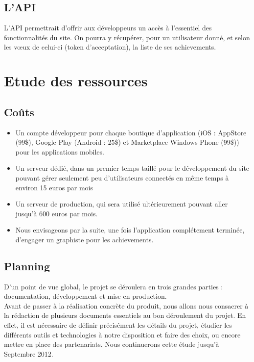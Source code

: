 \documentclass{life-fr}
\begin{document}
\section{L'API}

L'API permettrait d'offrir aux développeurs un accès à l'essentiel des fonctionnalités du site. On pourra y récupérer, pour un utilisateur donné, et selon les vœux de celui-ci (token d'acceptation), la liste de ses achievements.

\chapter{Etude des ressources}

\section{Coûts}

\begin{itemize}
  \item Un compte développeur pour chaque boutique d'application (iOS : AppStore (99\$), Google Play (Android : 25\$) et Marketplace Windows Phone (99\$)) pour les applications mobiles.
  \item Un serveur dédié, dans un premier temps taillé pour le développement du site pouvant gérer seulement peu d'utilisateurs connectés en même temps à environ 15 euros par mois
  \item Un serveur de production, qui sera utilisé ultérieurement pouvant aller jusqu'à 600 euros par mois.
  \item Nous envisageons par la suite, une fois l'application complétement terminée, d'engager un graphiste pour les achievements.
\end{itemize}

\section{Planning}

D'un point de vue global, le projet se déroulera en trois grandes parties : documentation, développement et mise en production.\\

Avant de passer à la réalisation concrète du produit, nous allons nous consacrer à la rédaction de plusieurs documents essentiels au bon déroulement du projet. En effet, il est nécessaire de définir précisément les détails du projet, étudier les différents outils et technologies à notre disposition et faire des choix, ou encore mettre en place des partenariats. Nous continuerons cette étude jusqu'à Septembre 2012.\\
\end{document}
